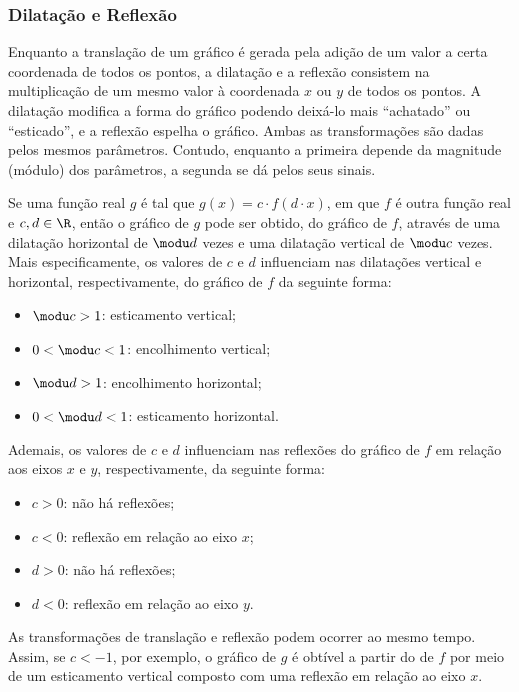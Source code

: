 \subsubsection{Dilatação e Reflexão}

Enquanto a translação de um gráfico é gerada pela adição de um valor a certa coordenada de todos os pontos, a dilatação e a reflexão consistem na multiplicação de um mesmo valor à coordenada $x$ ou $y$ de todos os pontos.
A dilatação modifica a forma do gráfico podendo deixá-lo mais ``achatado'' ou ``esticado'', e a reflexão espelha o gráfico.
Ambas as transformações são dadas pelos mesmos parâmetros.
Contudo, enquanto a primeira depende da magnitude (módulo) dos parâmetros, a segunda se dá pelos seus sinais.

Se uma função real $g$ é tal que $g(x) = c \cdot f(d\cdot x)$, em que $f$ é outra função real e $c,d\in \R$, então o gráfico de $g$ pode ser obtido, do gráfico de $f$, através de uma dilatação horizontal de $\modu d$ vezes e uma dilatação vertical de $\modu c$ vezes. 
Mais especificamente, os valores de $c$ e $d$ influenciam nas dilatações vertical e horizontal, respectivamente, do gráfico de $f$ da seguinte forma:
%
\begin{itemize}
          \item $\modu c>1$: esticamento vertical;
          \item $0<\modu c<1$: encolhimento vertical;
          \item $\modu d>1$: encolhimento horizontal;
          \item $0<\modu d<1$: esticamento horizontal.
\end{itemize}
%
Ademais, os valores de $c$ e $d$ influenciam nas reflexões do gráfico de $f$ em relação aos eixos $x$ e $y$, respectivamente, da seguinte forma:
%
\begin{itemize}
  \item $c > 0$: não há reflexões;
  \item $c < 0$: reflexão em relação ao eixo $x$;
  \item $d > 0$: não há reflexões;
  \item $d < 0$: reflexão em relação ao eixo $y$.
\end{itemize}

As transformações de translação e reflexão podem ocorrer ao mesmo tempo.
Assim, se $c<-1$, por exemplo, o gráfico de $g$ é obtível a partir do de $f$ por meio de um esticamento vertical composto com uma reflexão em relação ao eixo $x$.

